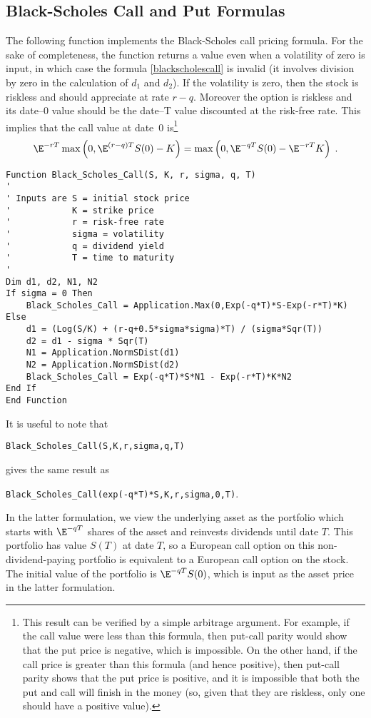 \subsection*{Black-Scholes Call and Put Formulas}
The following function implements the Black-Scholes call pricing formula. For the sake of completeness, the function returns a value even when a volatility of zero is input, in which case the formula \eqref{blackscholescall} is invalid (it involves division by zero in the calculation of $d_1$ and $d_2$).  If the volatility is zero, then the stock is riskless and should appreciate at rate $r-q$.  Moreover the option is riskless and its date--0 value should be the date--T value discounted at the risk-free rate.  This implies that the call value at date~0 is\footnote{This result can be verified by a simple arbitrage argument.  For example, if the call value were less than this formula, then put-call parity would show that the put price is negative, which is impossible.  On the other hand, if the call price is greater than this formula (and hence positive), then put-call parity shows that the put price is positive, and it is impossible that both the put and call will finish in the money (so, given that they are riskless, only one should have a positive value).}
$$\E^{-rT}\max\left(0,\E^{(r-q)T}S(0)-K\right) = \max \left(0, \E^{-qT}S(0)-\E^{-rT}K\right)\; .$$

\small\begin{verbatim}
Function Black_Scholes_Call(S, K, r, sigma, q, T)
'
' Inputs are S = initial stock price
'            K = strike price
'            r = risk-free rate
'            sigma = volatility
'            q = dividend yield
'            T = time to maturity
'
Dim d1, d2, N1, N2
If sigma = 0 Then
    Black_Scholes_Call = Application.Max(0,Exp(-q*T)*S-Exp(-r*T)*K)
Else
    d1 = (Log(S/K) + (r-q+0.5*sigma*sigma)*T) / (sigma*Sqr(T))
    d2 = d1 - sigma * Sqr(T)
    N1 = Application.NormSDist(d1)
    N2 = Application.NormSDist(d2)
    Black_Scholes_Call = Exp(-q*T)*S*N1 - Exp(-r*T)*K*N2
End If
End Function
\end{verbatim}\normalsize


 
It is useful to note that 
\small
\begin{center}
\verb!Black_Scholes_Call(S,K,r,sigma,q,T)! 
\end{center}
\normalsize
gives the same result as 
\small
\begin{center}
\verb!Black_Scholes_Call(exp(-q*T)*S,K,r,sigma,0,T)!.
\end{center}
\normalsize
In the latter formulation, we view the underlying asset as the portfolio which starts with $\E^{-qT}$ shares of the asset and reinvests dividends until date $T$.  This portfolio has value $S(T)$ at date $T$, so a European call option on this non-dividend-paying portfolio is equivalent to a European call option on the stock.  The initial value of the portfolio is $\E^{-qT}S(0)$, which is input as the asset price in the latter formulation.


